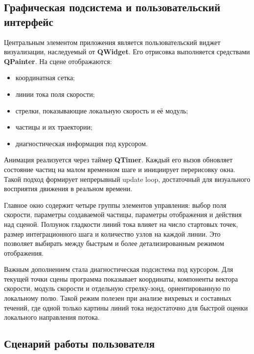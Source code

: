 \documentclass[14pt,a4paper]{extarticle}
\numberwithin{figure}{section}
\numberwithin{table}{section}
\begin{document}
\subsection{Графическая подсистема и пользовательский интерфейс}

Центральным элементом приложения является пользовательский виджет визуализации,
наследуемый от \textbf{QWidget}. Его отрисовка выполняется средствами
\textbf{QPainter}. На сцене отображаются:
\begin{itemize}
    \item координатная сетка;
    \item линии тока поля скорости;
    \item стрелки, показывающие локальную скорость и её модуль;
    \item частицы и их траектории;
    \item диагностическая информация под курсором.
\end{itemize}

Анимация реализуется через таймер \textbf{QTimer}. Каждый его вызов обновляет
состояние частиц на малом временном шаге и инициирует перерисовку окна. Такой
подход формирует непрерывный update loop, достаточный для визуального восприятия
движения в реальном времени.

Главное окно содержит четыре группы элементов управления: выбор поля скорости,
параметры создаваемой частицы, параметры отображения и действия над сценой.
Ползунок гладкости линий тока влияет на число стартовых точек, размер
интеграционного шага и количество узлов на каждой линии. Это позволяет выбирать
между быстрым и более детализированным режимом отображения.

Важным дополнением стала диагностическая подсистема под курсором. Для текущей
точки сцены программа показывает координаты, компоненты вектора скорости,
модуль скорости и отдельную стрелку-зонд, ориентированную по локальному полю.
Такой режим полезен при анализе вихревых и составных течений, где одной только
картины линий тока недостаточно для быстрой оценки локального направления потока.

\subsection{Сценарий работы пользователя}
\end{document}
